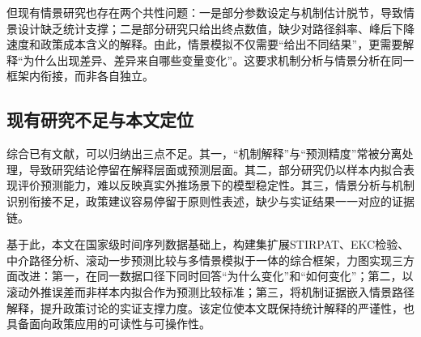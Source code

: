 但现有情景研究也存在两个共性问题：一是部分参数设定与机制估计脱节，导致情景设计缺乏统计支撑；二是部分研究只给出终点数值，缺少对路径斜率、峰后下降速度和政策成本含义的解释。由此，情景模拟不仅需要“给出不同结果”，更需要解释“为什么出现差异、差异来自哪些变量变化”。这要求机制分析与情景分析在同一框架内衔接，而非各自独立。

\subsection{现有研究不足与本文定位}
综合已有文献，可以归纳出三点不足。其一，“机制解释”与“预测精度”常被分离处理，导致研究结论停留在解释层面或预测层面。其二，部分研究仍以样本内拟合表现评价预测能力，难以反映真实外推场景下的模型稳定性。其三，情景分析与机制识别衔接不足，政策建议容易停留于原则性表述，缺少与实证结果一一对应的证据链。

基于此，本文在国家级时间序列数据基础上，构建集扩展STIRPAT、EKC检验、中介路径分析、滚动一步预测比较与多情景模拟于一体的综合框架，力图实现三方面改进：第一，在同一数据口径下同时回答“为什么变化”和“如何变化”；第二，以滚动外推误差而非样本内拟合作为预测比较标准；第三，将机制证据嵌入情景路径解释，提升政策讨论的实证支撑力度。该定位使本文既保持统计解释的严谨性，也具备面向政策应用的可读性与可操作性。
